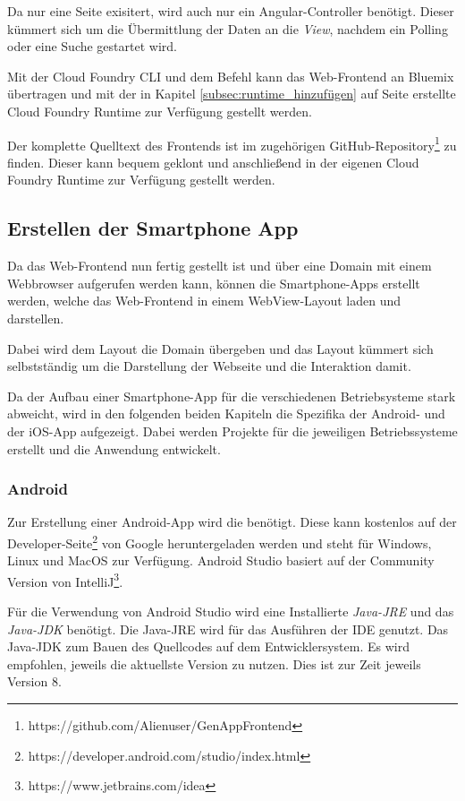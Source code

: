 Da nur eine Seite exisitert, wird auch nur ein Angular-Controller benötigt. Dieser kümmert sich um die Übermittlung der
Daten an die \textit{View}, nachdem ein Polling oder eine Suche gestartet wird.

Mit der Cloud Foundry CLI und dem Befehl  kann das Web-Frontend an Bluemix übertragen und mit der in Kapitel
\ref{subsec:runtime_hinzufügen} auf Seite \pageref{subsec:runtime_hinzufügen} erstellte Cloud Foundry Runtime zur Verfügung
gestellt werden.

Der komplette Quelltext des Frontends ist im zugehörigen GitHub-Repository\footnote{https://github.com/Alienuser/GenAppFrontend}
zu finden. Dieser kann bequem geklont und anschließend in der eigenen Cloud Foundry Runtime zur Verfügung gestellt
werden.

\subsection{Erstellen der Smartphone App}
Da das Web-Frontend nun fertig gestellt ist und über eine Domain mit einem Webbrowser aufgerufen werden kann, können die
Smartphone-Apps erstellt werden, welche das Web-Frontend in einem WebView-Layout laden und darstellen.

Dabei wird dem Layout die Domain übergeben und das Layout kümmert sich selbstständig um die Darstellung der Webseite und
die Interaktion damit.

Da der Aufbau einer Smartphone-App für die verschiedenen Betriebsysteme stark abweicht, wird in den folgenden beiden
Kapiteln die Spezifika der Android- und der iOS-App aufgezeigt. Dabei werden Projekte für die jeweiligen Betriebssysteme
erstellt und die Anwendung entwickelt.

\subsubsection{Android}
Zur Erstellung einer Android-App wird die  benötigt. Diese kann kostenlos auf der
Developer-Seite\footnote{https://developer.android.com/studio/index.html} von Google heruntergeladen werden und steht für
Windows, Linux und MacOS zur Verfügung. Android Studio basiert auf der Community Version von
IntelliJ\footnote{https://www.jetbrains.com/idea}.

Für die Verwendung von Android Studio wird eine Installierte \textit{Java-JRE} und das \textit{Java-JDK} benötigt. Die
Java-JRE wird für das Ausführen der IDE genutzt. Das Java-JDK zum Bauen des Quellcodes auf dem Entwicklersystem. Es wird
empfohlen, jeweils die aktuellste Version zu nutzen. Dies ist zur Zeit jeweils Version 8.

